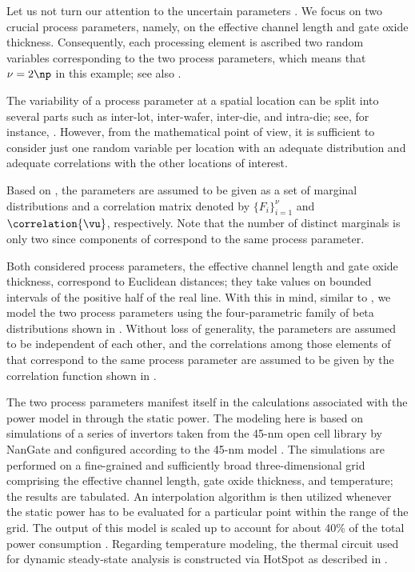 Let us not turn our attention to the uncertain parameters \vu. We focus on two
crucial process parameters, namely, on the effective channel length and
gate oxide thickness. Consequently, each processing element is ascribed two
random variables corresponding to the two process parameters, which means that
$\nu = 2 \np$ in this example; see also .

\begin{remark}
The variability of a process parameter at a spatial location can be split into
several parts such as inter-lot, inter-wafer, inter-die, and intra-die; see, for
instance, \cite{juan2012}. However, from the mathematical point of view, it is
sufficient to consider just one random variable per location with an adequate
distribution and adequate correlations with the other locations of interest.
\end{remark}

Based on , the parameters \vu are assumed to be given as
a set of marginal distributions and a correlation matrix denoted by $\{ F_i
\}_{i = 1}^\nu$ and $\correlation{\vu}$, respectively. Note that the number of
distinct marginals is only two since \np components of \vu correspond to the
same process parameter.

Both considered process parameters, the effective channel length and gate oxide
thickness, correspond to Euclidean distances; they take values on bounded
intervals of the positive half of the real line. With this in mind, similar to
, we model the two process parameters using
the four-parametric family of beta distributions shown in
. Without loss of generality, the parameters are assumed
to be independent of each other, and the correlations among those elements of
\vu that correspond to the same process parameter are assumed to be given by the
correlation function shown in .

The two process parameters manifest itself in the calculations associated with
the power model in  through the static power. The
modeling here is based on  simulations of a series of 
invertors taken from the 45-nm open cell library by NanGate \cite{nangate} and
configured according to the 45-nm   model \cite{ptm}. The
simulations are performed on a fine-grained and sufficiently broad
three-dimensional grid comprising the effective channel length, gate oxide
thickness, and temperature; the results are tabulated. An interpolation
algorithm is then utilized whenever the static power has to be evaluated for a
particular point within the range of the grid. The output of this model is
scaled up to account for about 40\% of the total power consumption
\cite{liu2007}. Regarding temperature modeling, the thermal  circuit used
for dynamic steady-state analysis is constructed via HotSpot \cite{skadron2003}
as described in .

